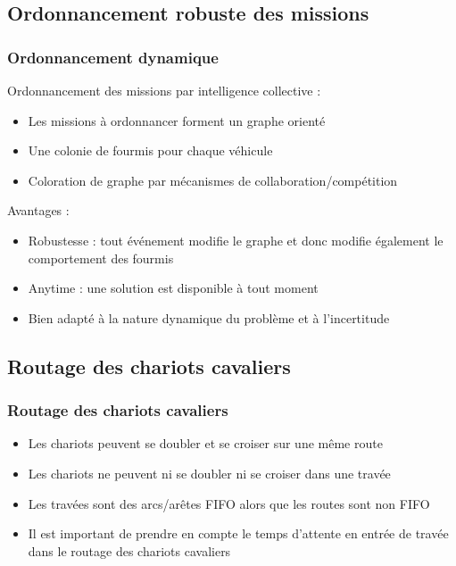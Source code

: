 \documentclass{beamer}
\begin{document}
\begin{frame}
\subsection*{Ordonnancement robuste des missions}
\frametitle{Ordonnancement dynamique\cite{lesauvageICCSA2009,lesauvageMajestic09}}
\begin{block}{Ordonnancement des missions par intelligence collective : }
  \begin{itemize}    
    \item Les missions à ordonnancer forment un graphe orienté    
    \item Une colonie de fourmis pour chaque véhicule
    \item Coloration de graphe par mécanismes de collaboration/compétition\cite{bertelle02}
  \end{itemize}
\end{block}

  
\begin{block}{Avantages : }
  \begin{itemize}
    \item Robustesse : tout événement modifie le graphe et donc modifie également le comportement des fourmis
    \item Anytime : une solution est disponible à tout moment
    \item Bien adapté à la nature dynamique du problème et à l'incertitude
  \end{itemize}
\end{block}


\end{frame}

\begin{frame}
\subsection*{Routage des chariots cavaliers}
\frametitle{Routage des chariots cavaliers}

\begin{itemize}
 \item Les chariots peuvent se doubler et se croiser sur une même route
 \item Les chariots ne peuvent ni se doubler ni se croiser dans une travée
\end{itemize}

\begin{itemize}
 \item Les travées sont des arcs/arêtes FIFO alors que les routes sont non FIFO
 \item Il est important de prendre en compte le temps d'attente en entrée de travée dans le routage des chariots cavaliers\cite{Orda90}
 \end{itemize}


\end{frame}
\end{document}
